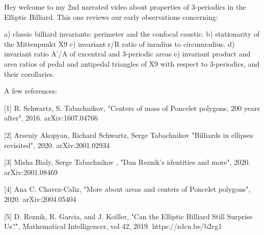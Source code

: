 Hey welcome to my 2nd narrated video about properties of 3-periodics in the Elliptic Billiard. This one reviews our early observations concerning:

a) classic billiard invariants: perimeter and the confocal caustic. 
b) stationarity of the Mittenpunkt X9
c) invariant r/R ratio of inradius to circumradius.
d) invariant ratio A'/A of excentral and 3-periodic areas
e) invariant product and area ratios of pedal and antipedal triangles of X9 with respect to 3-periodics, and their corollaries.

A few references:

[1] R. Schwartz, S. Tabachnikov, "Centers of mass of Poncelet polygons, 200 years after", 2016. arXiv:1607.04766

[2] Arseniy Akopyan, Richard Schwartz, Serge Tabachnikov "Billiards in ellipses revisited", 2020. arXiv:2001.02934

[3] Misha Bialy, Serge Tabachnikov , "Dan Reznik's identities and more", 2020. arXiv:2001.08469

[4]  Ana C. Chavez-Caliz, "More about areas and centers of Poncelet polygons", 2020. arXiv:2004.05404

[5] D. Reznik, R. Garcia, and J. Koiller, "Can the Elliptic Billiard Still Surprise Us?", Mathematical Intelligencer, vol 42, 2019. https://rdcu.be/b2cg1
